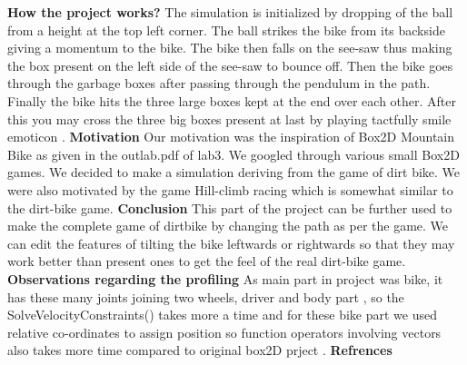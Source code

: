 \documentclass[17pt, a4paper]{extarticle}
\begin{document}
\newline
\newline
\color{blue}
\textbf{How the project works?}\newline
\color{black}
The simulation is initialized by dropping of the ball from a height at the top left corner. The ball strikes the bike from its backside giving a momentum to the bike. The bike then falls on the see-saw thus making the box present on the left side of the see-saw to bounce off. Then the bike goes through the garbage boxes after passing through the pendulum in the path. Finally the bike hits the three large boxes kept at the end over each other. After this you may cross the three big boxes present at last by playing tactfully smile emoticon .
\newline
\newline
\color{blue}
\textbf{Motivation}\newline
\color{black}
Our motivation was the inspiration of Box2D Mountain Bike as given in the outlab.pdf of lab3. We googled through various small Box2D games. We decided to make a simulation deriving from the game of dirt bike. We were also motivated by the game Hill-climb racing which is somewhat similar to the dirt-bike game.
\newline
\newline
\color{blue}
\textbf{Conclusion}\newline
\color{black}
This part of the project can be further used to make the complete game of dirtbike by changing the path as per the game. We can edit the features of tilting the bike leftwards or rightwards so that they may work better than present ones to get the feel of the real dirt-bike game.
\color{black}
\newpage
\color{red} 
\textbf{Observations regarding the profiling }\newline
\color{black}
As main part in project was bike, it has these many joints joining two wheels, driver and body part , so the SolveVelocityConstraints() takes more  a time 
and for these bike part we used relative co-ordinates to assign position so function operators involving vectors also takes more time  compared to
 original box2D prject .\newpage
\color{red} 
\textbf{Refrences}\newline
\color{black}
\cite{bib1}
\cite{bib2}


\end{document}
